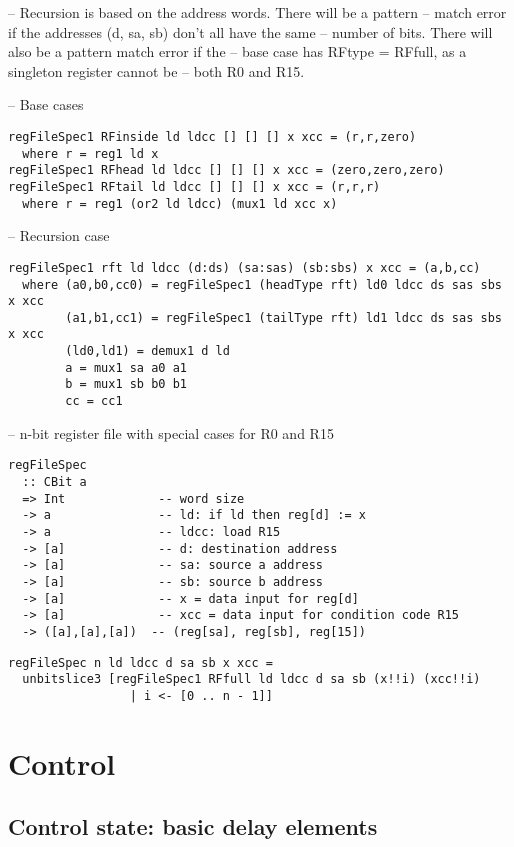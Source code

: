 \documentclass[11pt]{article}
\begin{document}
-- Recursion is based on the address words.  There will be a pattern
-- match error if the addresses (d, sa, sb) don't all have the same
-- number of bits.  There will also be a pattern match error if the
-- base case has RFtype = RFfull, as a singleton register cannot be
-- both R0 and R15.

-- Base cases

\begin{verbatim}
regFileSpec1 RFinside ld ldcc [] [] [] x xcc = (r,r,zero)
  where r = reg1 ld x
regFileSpec1 RFhead ld ldcc [] [] [] x xcc = (zero,zero,zero)
regFileSpec1 RFtail ld ldcc [] [] [] x xcc = (r,r,r)
  where r = reg1 (or2 ld ldcc) (mux1 ld xcc x)
\end{verbatim}

-- Recursion case

\begin{verbatim}
regFileSpec1 rft ld ldcc (d:ds) (sa:sas) (sb:sbs) x xcc = (a,b,cc)
  where (a0,b0,cc0) = regFileSpec1 (headType rft) ld0 ldcc ds sas sbs x xcc
        (a1,b1,cc1) = regFileSpec1 (tailType rft) ld1 ldcc ds sas sbs x xcc
        (ld0,ld1) = demux1 d ld
        a = mux1 sa a0 a1
        b = mux1 sb b0 b1
        cc = cc1
\end{verbatim}

-- n-bit register file with special cases for R0 and R15

\begin{verbatim}
regFileSpec
  :: CBit a
  => Int             -- word size
  -> a               -- ld: if ld then reg[d] := x
  -> a               -- ldcc: load R15
  -> [a]             -- d: destination address
  -> [a]             -- sa: source a address
  -> [a]             -- sb: source b address
  -> [a]             -- x = data input for reg[d]
  -> [a]             -- xcc = data input for condition code R15
  -> ([a],[a],[a])  -- (reg[sa], reg[sb], reg[15])
\end{verbatim}

\begin{verbatim}
regFileSpec n ld ldcc d sa sb x xcc =
  unbitslice3 [regFileSpec1 RFfull ld ldcc d sa sb (x!!i) (xcc!!i)
                 | i <- [0 .. n - 1]]
\end{verbatim}


\section{Control}
\label{sec:orgd158294}
\subsection{Control state: basic delay elements}
\label{sec:org87adaae}
\end{document}
